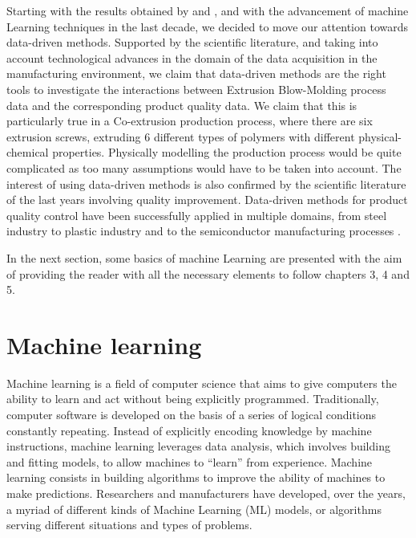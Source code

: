 
Starting with the results obtained by \citep{diraddo1993line} and \citep{ramana2013data}, and with the advancement of machine Learning techniques in the last decade, we decided to move our attention towards data-driven methods. Supported by the scientific literature, and taking into account technological advances in the domain of the data acquisition in the manufacturing environment, we claim that data-driven methods are the right tools to investigate the interactions between Extrusion Blow-Molding process data and the corresponding product quality data. We claim that this is particularly true in a Co-extrusion production process, where there are six extrusion screws, extruding 6 different types of polymers with different physical-chemical properties. Physically modelling the production process would be quite complicated as too many assumptions would have to be taken into account. The interest of using data-driven methods is also confirmed by the scientific literature of the last years involving quality improvement. Data-driven methods for product quality control have been successfully applied in multiple domains, from steel industry \citep{lieber2013quality,li2018ensemble} to plastic industry \citep{chen2008neural,nagorny2017quality,haeussler1996quality,tellaeche2013machine,sharma2017taguchi} and to the semiconductor manufacturing processes \citep{melhem2016regression,lenz2013data,jiang2020novel}.

In the next section, some basics of machine Learning are presented with the aim of providing the reader with all the necessary elements to follow chapters 3, 4 and 5.

\section{Machine learning}

Machine learning is a field of computer science that aims to give computers the ability to learn and act without being explicitly programmed.  Traditionally, computer software is developed on the basis of a series of logical conditions constantly repeating. Instead of explicitly encoding knowledge by machine instructions, machine learning leverages data analysis, which involves building and fitting models, to allow machines to 
``learn'' from experience. Machine learning consists in building algorithms to improve the ability of machines to make predictions. Researchers and manufacturers have developed, over the years, a myriad of different kinds of Machine Learning (ML) models, or algorithms serving different situations and types of problems.

